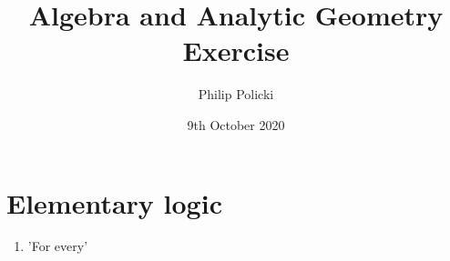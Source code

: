 \documentclass{article}
\title{ Algebra and Analytic Geometry Exercise }
\author{Philip Policki}
\date{9th October 2020}
\begin{document}
\maketitle

\section{Elementary logic}
\begin{enumerate}
	\item 'For every'
\end{enumerate}
\end{document}
